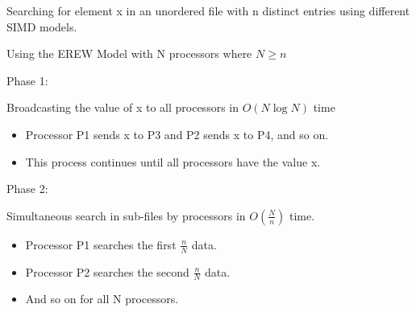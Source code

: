 \documentclass[a4paper, 10pt]{book}
\begin{document}
                    \begin{tcolorbox}[colback=white, colframe=black!25, title=Example]
                    
                        Searching for element x in an unordered file with n distinct entries using different SIMD models.
    
                        \begin{minipage}{0.49\linewidth} %
                            \footnotesize
                            \vspace{0.3cm}
                            \begin{tcolorbox}[colframe=white, size=small]
    
                                {\bold Using the EREW Model with N processors where $N\geq n$}
                                
                                \vspace{0.3cm}

                                {\bold Phase 1:}
                                
                                Broadcasting the value of x to all processors in  $O(N\log N)$ time
    
                                \begin{itemize}
                                    
                                    \item Processor P1 sends x to P3 and P2 sends x to P4, and so on.
                                    \item This process continues until all processors have the value x.
    
                                \end{itemize}
    
                                {\bold Phase 2:}
                                
                                Simultaneous search in sub-files by processors in $O(\frac{N}{n})$ time.
                                
                                \begin{itemize}
                                    
                                    \item Processor P1 searches the first $\frac{n}{N}$ data.
                                    \item Processor P2 searches the second $\frac{n}{N}$ data.
                                    \item And so on for all N processors.
    

\end{itemize}
\end{tcolorbox}
\end{minipage}
\end{tcolorbox}
\end{document}
